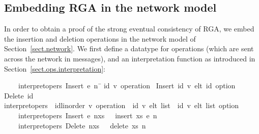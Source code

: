 \subsection{Embedding RGA in the network model}

In order to obtain a proof of the strong eventual consistency of RGA, we embed the insertion and deletion operations in the network model of Section~\ref{sect.network}.
We first define a datatype for operations (which are sent across the network in messages), and an interpretation function as introduced in Section~\ref{sect.ops.interpretation}:
\begin{isabelle}
~~~~{\isachardoublequoteopen}interpret{\isacharunderscore}opers\ {\isacharparenleft}Insert\ e\ n{\isacharparenright}\ \=\kill
{} {\isacharparenleft}{\isacharprime}id{\isacharcomma}\ {\isacharprime}v{\isacharparenright}\ operation\ {\isacharequal} Insert\ {\isachardoublequoteopen}{\isacharparenleft}{\isacharprime}id{\isacharcomma}\ {\isacharprime}v{\isacharparenright}\ elt{\isachardoublequoteclose}\ {\isachardoublequoteopen}{\isacharprime}id\ option{\isachardoublequoteclose}\ {\isacharbar} Delete\ {\isachardoublequoteopen}{\isacharprime}id{\isachardoublequoteclose}\\[4pt]
 interpret{\isacharunderscore}opers\ {\isacharcolon}{\isacharcolon}\ {\isachardoublequoteopen}{\isacharparenleft}{\isacharprime}id{\isacharcolon}{\isacharcolon}linorder{\isacharcomma}\ {\isacharprime}v{\isacharparenright}\ operation\ {\isasymRightarrow}\ {\isacharparenleft}{\isacharprime}id{\isacharcomma}\ {\isacharprime}v{\isacharparenright}\ elt\ list\ {\isasymRightarrow}\ {\isacharparenleft}{\isacharprime}id{\isacharcomma}\ {\isacharprime}v{\isacharparenright}\ elt\ list\ option{\isachardoublequoteclose}\ \\
~~~~{\isachardoublequoteopen}interpret{\isacharunderscore}opers\ {\isacharparenleft}Insert\ e\ n{\isacharparenright}\>xs\ \ {\isacharequal}\ insert\ xs\ e\ n{\isachardoublequoteclose}\ {\isacharbar}\\
~~~~{\isachardoublequoteopen}interpret{\isacharunderscore}opers\ {\isacharparenleft}Delete\ n{\isacharparenright}\>xs\ \ {\isacharequal}\ delete\ xs\ n{\isachardoublequoteclose}
\end{isabelle}

